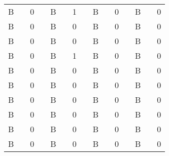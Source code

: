 \documentclass{article}
\begin{document}
\begin{table}
\begin{tabular}{c  c  c  c  c  c  c  c}
B &   & 0 &   & B &   & 1 &   & B &   & 0 &   & B &   & 0 &  \\
B &   & 0 &   & B &   & 0 &   & B &   & 0 &   & B &   & 0 &  \\
B &   & 0 &   & B &   & 0 &   & B &   & 0 &   & B &   & 0 &  \\
B &   & 0 &   & B &   & 1 &   & B &   & 0 &   & B &   & 0 &  \\
B &   & 0 &   & B &   & 0 &   & B &   & 0 &   & B &   & 0 &  \\
B &   & 0 &   & B &   & 0 &   & B &   & 0 &   & B &   & 0 &  \\
B &   & 0 &   & B &   & 0 &   & B &   & 0 &   & B &   & 0 &  \\
B &   & 0 &   & B &   & 0 &   & B &   & 0 &   & B &   & 0 &  \\
B &   & 0 &   & B &   & 0 &   & B &   & 0 &   & B &   & 0 &  \\
B &   & 0 &   & B &   & 0 &   & B &   & 0 &   & B &   & 0 &  \\


\end{tabular}
 

\end{table}
\end{document}
